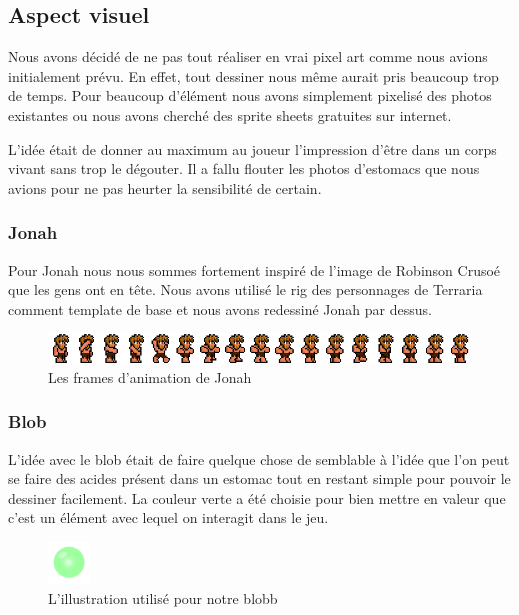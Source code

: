 \documentclass{prologArticle}
\begin{document}
\subsection{Aspect visuel}
Nous avons décidé de ne pas tout réaliser en vrai pixel art comme nous avions initialement prévu. En effet, tout dessiner nous même aurait pris beaucoup trop de temps. Pour beaucoup d'élément nous avons simplement pixelisé des photos existantes ou nous avons cherché des sprite sheets gratuites sur internet.

L'idée était de donner au maximum au joueur l'impression d'être dans un corps vivant sans trop le dégouter. Il a fallu flouter les photos d'estomacs que nous avions pour ne pas heurter la sensibilité de certain.

\subsubsection{Jonah}
Pour Jonah nous nous sommes fortement inspiré de l'image de Robinson Crusoé que les gens ont en tête. Nous avons utilisé le rig des personnages de Terraria comment template de base et nous avons redessiné Jonah par dessus.

\begin{figure}[H]
    \centering
    \includegraphics[width=\textwidth]{res/jona_sheet.png}
    \caption{Les frames d'animation de Jonah}
\end{figure}

\subsubsection{Blob}
L'idée avec le blob était de faire quelque chose de semblable à l'idée que l'on peut se faire des acides présent dans un estomac tout en restant simple pour pouvoir le dessiner facilement. La couleur verte a été choisie pour bien mettre en valeur que c'est un élément avec lequel on interagit dans le jeu.

\begin{figure}[H]
    \centering
    \includegraphics[width=0.1\textwidth]{res/blobb.png}
    \caption{L'illustration utilisé pour notre blobb}
\end{figure}
\end{document}
